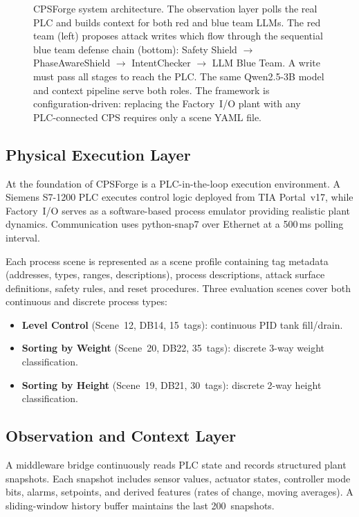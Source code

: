\begin{figure}[t]
\begin{tikzpicture}
    \end{tikzpicture}
    \caption{CPSForge system architecture. The observation layer polls the real PLC and builds context for both red and blue team LLMs. The red team (left) proposes attack writes which flow through the sequential blue team defense chain (bottom): Safety Shield $\to$ PhaseAwareShield $\to$ IntentChecker $\to$ LLM Blue Team. A write must pass all stages to reach the PLC. The same Qwen2.5-3B model and context pipeline serve both roles. The framework is configuration-driven: replacing the Factory~I/O plant with any PLC-connected CPS requires only a scene YAML file.}
    \label{fig:architecture}
\end{figure}

\subsection{Physical Execution Layer}

At the foundation of CPSForge is a PLC-in-the-loop execution environment. A Siemens S7-1200 PLC executes control logic deployed from TIA Portal~v17, while Factory~I/O serves as a software-based process emulator providing realistic plant dynamics. Communication uses python-snap7 over Ethernet at a 500\,ms polling interval.

Each process scene is represented as a scene profile containing tag metadata (addresses, types, ranges, descriptions), process descriptions, attack surface definitions, safety rules, and reset procedures. Three evaluation scenes cover both continuous and discrete process types:
\begin{itemize}[leftmargin=1.2em,nosep]
    \item \textbf{Level Control} (Scene~12, DB14, 15~tags): continuous PID tank fill/drain.
    \item \textbf{Sorting by Weight} (Scene~20, DB22, 35~tags): discrete 3-way weight classification.
    \item \textbf{Sorting by Height} (Scene~19, DB21, 30~tags): discrete 2-way height classification.
\end{itemize}

\subsection{Observation and Context Layer}

A middleware bridge continuously reads PLC state and records structured plant snapshots. Each snapshot includes sensor values, actuator states, controller mode bits, alarms, setpoints, and derived features (rates of change, moving averages). A sliding-window history buffer maintains the last 200~snapshots.

